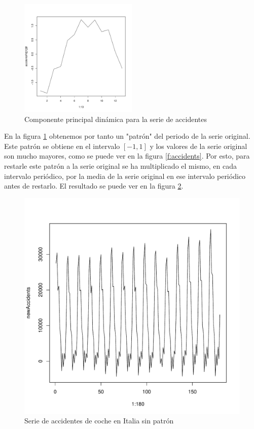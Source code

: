 \begin{figure}[]
 \centering
 \includegraphics[width=0.5\textwidth]{../imagenes/accidentsComp.pdf}
 \caption{Componente principal dinámica para la serie de accidentes}
 \label{f:accidentsComp}
\end{figure}

En la figura \ref{f:accidentsComp} obtenemos por tanto un "patrón" del periodo de la serie original. Este patrón se obtiene en el intervalo $[-1, 1]$ y los valores de la serie original son mucho mayores, como se puede ver en la figura \ref{f:accidents}. Por esto, para restarle este patrón a la serie original se ha multiplicado el mismo, en cada intervalo periódico, por la media de la serie original en ese intervalo periódico antes de restarlo. El resultado se puede ver en la figura \ref{f:accidentsSinPatron}.

\begin{figure}[]
 \includegraphics[width=\textwidth, height=0.4\textheight]{../imagenes/accidentsSinPatron.pdf}
 \caption{Serie de accidentes de coche en Italia sin patrón}
 \label{f:accidentsSinPatron}
\end{figure}

